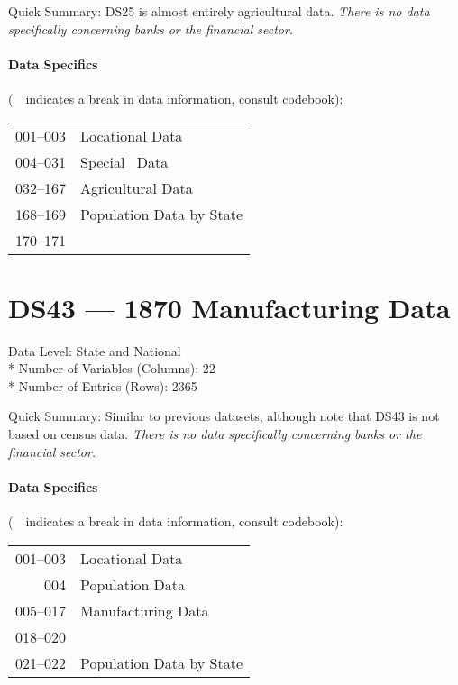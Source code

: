 ﻿\documentclass[12pt]{report}
\begin{document}
	\noindent Quick Summary: DS25 is almost entirely agricultural data. \textit{There is no data specifically concerning banks or the financial sector.}
	
	\paragraph{Data Specifics} (\guillemotleft~\guillemotright~indicates a break in data information, consult codebook):
	\vspace{1em}
	
	\begin{tabular}{r|l}
		001--003 & Locational Data\\
		004--031 & Special \textDelta~Data\\
		032--167 & Agricultural Data\\
		168--169 & Population Data by State\\
		170--171 & \guillemotleft~\guillemotright
	\end{tabular}
	\newpage

\section{DS43 --- 1870 Manufacturing Data}
	Data Level: State and National\\*
	Number of Variables (Columns): 22\\*
	Number of Entries (Rows): 2365
	\vspace{1.5em}
	
	\noindent Quick Summary: Similar to previous datasets, although note that DS43 is not based on census data. \textit{There is no data specifically concerning banks or the financial sector.}
	
	\paragraph{Data Specifics} (\guillemotleft~\guillemotright~indicates a break in data information, consult codebook):
	\vspace{1em}
	
	\begin{tabular}{r|l}
		001--003 & Locational Data\\
		004 & Population Data\\
		005--017 & Manufacturing Data\\
		018--020 & \guillemotleft~\guillemotright\\
		021--022 & Population Data by State
	\end{tabular}
\end{document}
